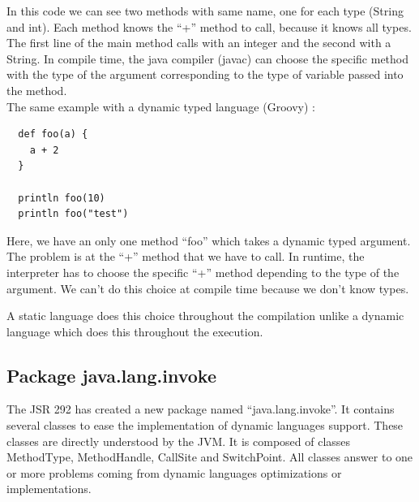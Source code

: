 \documentclass{sigplanconf}
\def \Jsr{\ac{JSR}\xspace}
\def \JSR{\Jsr 292\xspace}
\def \JVM{\ac{JVM}\xspace}
\begin{document}
      In this code we can see two methods with same name, one for each type (String and int).
      Each method knows the ``+'' method to call, because it knows all types.
      The first line of the main method calls with an integer and the second with a String.
      In compile time, the java compiler (javac) can choose the specific method with the type of the argument
      corresponding to the type of variable passed into the method.\\

      The same example with a dynamic typed language (Groovy) :

      {\tiny      
      \begin{verbatim}
  def foo(a) {
    a + 2
  }

  println foo(10)
  println foo("test")
      \end{verbatim}
      }

      Here, we have an only one method ``foo'' which takes a dynamic typed argument.
      The problem is at the ``+'' method that we have to call.
      In runtime, the interpreter has to choose the specific ``+'' method depending to the type of the argument.
      We can't do this choice at compile time because we don't know types.

%       
% 


      A static language does this choice throughout the compilation
      unlike a dynamic language which does this throughout the execution.

    \subsection{Package java.lang.invoke}
      The \JSR has created a new package named ``java.lang.invoke''.
      It contains several classes to ease the implementation of dynamic languages support.
      These classes are directly understood by the \JVM.
      It is composed of classes MethodType, MethodHandle, CallSite and SwitchPoint.
      All classes answer to one or more problems coming from dynamic languages optimizations or implementations.
\end{document}
